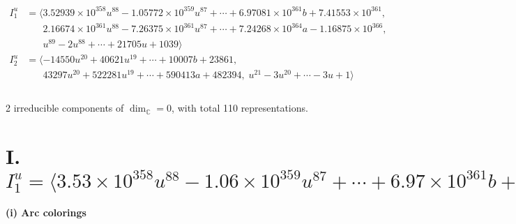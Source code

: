 \documentclass[1p]{elsarticle_modified}
\theoremstyle{definition}
\begin{document}
\begin{align*}
I^u_{1}&=\langle 
3.52939\times10^{358} u^{88}-1.05772\times10^{359} u^{87}+\cdots+6.97081\times10^{361} b+7.41553\times10^{361},\\
\phantom{I^u_{1}}&\phantom{= \langle  }2.16674\times10^{361} u^{88}-7.26375\times10^{361} u^{87}+\cdots+7.24268\times10^{364} a-1.16875\times10^{366},\\
\phantom{I^u_{1}}&\phantom{= \langle  }u^{89}-2 u^{88}+\cdots+21705 u+1039\rangle \\
I^u_{2}&=\langle 
-14550 u^{20}+40621 u^{19}+\cdots+10007 b+23861,\\
\phantom{I^u_{2}}&\phantom{= \langle  }43297 u^{20}+522281 u^{19}+\cdots+590413 a+482394,\;u^{21}-3 u^{20}+\cdots-3 u+1\rangle \\
\\
\end{align*}
\raggedright * 2 irreducible components of $\dim_{\mathbb{C}}=0$, with total 110 representations.\\
\newpage
\renewcommand{\arraystretch}{1}
\centering \section*{I. $I^u_{1}= \langle 3.53\times10^{358} u^{88}-1.06\times10^{359} u^{87}+\cdots+6.97\times10^{361} b+7.42\times10^{361},\;2.17\times10^{361} u^{88}-7.26\times10^{361} u^{87}+\cdots+7.24\times10^{364} a-1.17\times10^{366},\;u^{89}-2 u^{88}+\cdots+21705 u+1039 \rangle$}
\flushleft \textbf{(i) Arc colorings}\\
\end{document}
